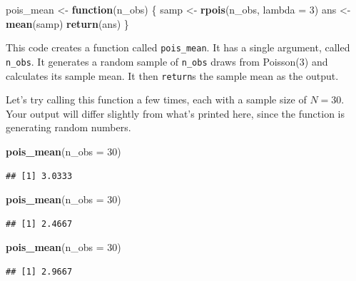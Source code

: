 \documentclass[12pt,oneside,openany]{book}
\newenvironment{Shaded}{\begin{snugshade}}{\end{snugshade}}
\newcommand{\KeywordTok}[1]{\textcolor[rgb]{0.13,0.29,0.53}{\textbf{#1}}}
\newcommand{\DataTypeTok}[1]{\textcolor[rgb]{0.13,0.29,0.53}{#1}}
\newcommand{\DecValTok}[1]{\textcolor[rgb]{0.00,0.00,0.81}{#1}}
\newcommand{\StringTok}[1]{\textcolor[rgb]{0.31,0.60,0.02}{#1}}
\newcommand{\ControlFlowTok}[1]{\textcolor[rgb]{0.13,0.29,0.53}{\textbf{#1}}}
\newcommand{\NormalTok}[1]{#1}
\begin{document}
\begin{Shaded}
\begin{Highlighting}[]
\NormalTok{pois_mean <-}\StringTok{ }\ControlFlowTok{function}\NormalTok{(n_obs) \{}
\NormalTok{  samp <-}\StringTok{ }\KeywordTok{rpois}\NormalTok{(n_obs, }\DataTypeTok{lambda =} \DecValTok{3}\NormalTok{)}
\NormalTok{  ans <-}\StringTok{ }\KeywordTok{mean}\NormalTok{(samp)}
  \KeywordTok{return}\NormalTok{(ans)}
\NormalTok{\}}
\end{Highlighting}
\end{Shaded}

This code creates a function called \texttt{pois\_mean}. It has a single
argument, called \texttt{n\_obs}. It generates a random sample of
\texttt{n\_obs} draws from Poisson(3) and calculates its sample mean. It
then \texttt{return}s the sample mean as the output.

Let's try calling this function a few times, each with a sample size of
\(N = 30\). Your output will differ slightly from what's printed here,
since the function is generating random numbers.

\begin{Shaded}
\begin{Highlighting}[]
\KeywordTok{pois_mean}\NormalTok{(}\DataTypeTok{n_obs =} \DecValTok{30}\NormalTok{)}
\end{Highlighting}
\end{Shaded}

\begin{verbatim}
## [1] 3.0333
\end{verbatim}

\begin{Shaded}
\begin{Highlighting}[]
\KeywordTok{pois_mean}\NormalTok{(}\DataTypeTok{n_obs =} \DecValTok{30}\NormalTok{)}
\end{Highlighting}
\end{Shaded}

\begin{verbatim}
## [1] 2.4667
\end{verbatim}

\begin{Shaded}
\begin{Highlighting}[]
\KeywordTok{pois_mean}\NormalTok{(}\DataTypeTok{n_obs =} \DecValTok{30}\NormalTok{)}
\end{Highlighting}
\end{Shaded}

\begin{verbatim}
## [1] 2.9667
\end{verbatim}
\end{document}
